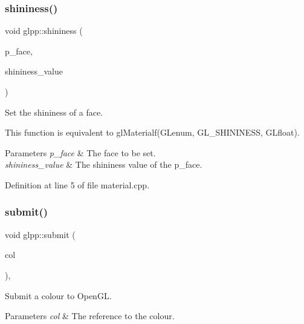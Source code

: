 \subsubsection{\texorpdfstring{shininess()}{shininess()}}
{\footnotesize\ttfamily void glpp\+::shininess (\begin{DoxyParamCaption}\item[{\hyperlink{namespaceglpp_aebf73491431939f1e6ec6ec2d4404244}{face}}]{p\+\_\+face,  }\item[{const G\+Lfloat}]{shininess\+\_\+value }\end{DoxyParamCaption})}



Set the shininess of a face. 

This function is equivalent to gl\+Materialf(\+G\+Lenum, G\+L\+\_\+\+S\+H\+I\+N\+I\+N\+E\+S\+S, G\+Lfloat).


\begin{DoxyParams}{Parameters}
{\em p\+\_\+face} & The face to be set. \\
\hline
{\em shininess\+\_\+value} & The shininess value of the {\ttfamily p\+\_\+face}. \\
\hline
\end{DoxyParams}


Definition at line 5 of file material.\+cpp.

\mbox{\label{namespaceglpp_a62c5b57a9af9085a6d51a4d928166fcf}} 
\subsubsection{\texorpdfstring{submit()}{submit()}\hspace{0.1cm}{\footnotesize\ttfamily [1/4]}}
{\footnotesize\ttfamily void glpp\+::submit (\begin{DoxyParamCaption}\item[{const \hyperlink{classglpp_1_1colour}{colour} \&}]{col }\end{DoxyParamCaption})\hspace{0.3cm}{\ttfamily [inline]}, {\ttfamily [noexcept]}}



Submit a colour to Open\+GL. 


\begin{DoxyParams}{Parameters}
{\em col} & The reference to the colour. \\
\hline
\end{DoxyParams}


